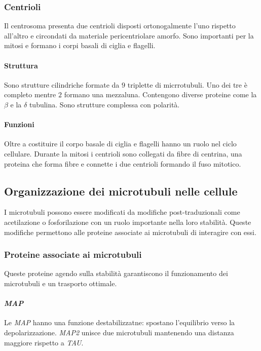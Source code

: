 		\subsubsection{Centrioli}
		Il centrosoma presenta due centrioli disposti ortonogalmente l'uno rispetto all'altro e circondati da materiale pericentriolare amorfo.
		Sono importanti per la mitosi e formano i corpi basali di ciglia e flagelli.
			
			\paragraph{Struttura}
			Sono strutture cilindriche formate da $9$ triplette di micrrotubuli.
			Uno dei tre \`e completo mentre $2$ formano una mezzaluna.
			Contengono diverse proteine come la $\beta$ e la $\delta$ tubulina.
			Sono strutture complessa con polarit\`a.

			\paragraph{Funzioni}
			Oltre a costituire il corpo basale di ciglia e flagelli hanno un ruolo nel ciclo cellulare.
			Durante la mitosi i centrioli sono collegati da fibre di centrina, una proteina che forma fibre e connette i due centrioli formando il fuso mitotico.

	\subsection{Organizzazione dei microtubuli nelle cellule}
	I microtubuli possono essere modificati da modifiche post-traduzionali come acetilazione o fosforilazione con un ruolo importante nella loro stabilit\`a.
	Queste modifiche permettono alle proteine associate ai microtubuli di interagire con essi.
	
		\subsubsection{Proteine associate ai microtubuli}
		Queste proteine agendo sulla stabilit\`a garantiscono il funzionamento dei microtubuli e un trasporto ottimale.

			\paragraph{\emph{MAP}}
			Le \emph{MAP} hanno una funzione destabilizzatne: spostano l'equilibrio verso la depolarizzazione.
			\emph{MAP2} unisce due microtubuli mantenendo una distanza maggiore rispetto a \emph{TAU}.

